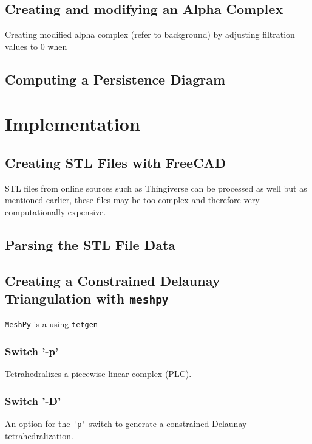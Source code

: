 \documentclass[ma]{uncgdissertationexp}
\theoremstyle{plain}
\theoremstyle{definition}
\theoremstyle{remark}
\begin{document}
\subsection{Creating and modifying an Alpha Complex}
\par Creating modified alpha complex (refer to background) by adjusting filtration values to 0 when 

\subsection{Computing a Persistence Diagram}

\section{Implementation}

\subsection{Creating STL Files with FreeCAD}

\par STL files from online sources such as Thingiverse can be processed as well but as mentioned earlier, these files may be too complex and therefore very computationally expensive. 

\subsection{Parsing the STL File Data}

\cprotect\subsection{Creating a Constrained Delaunay Triangulation with \verb+meshpy+}

\par \verb"MeshPy" is a using \verb"tetgen" \cite{tetgen}

\subsubsection{Switch '-p'}
Tetrahedralizes a piecewise linear complex (PLC).

\subsubsection{Switch '-D'}
An option for the \verb"'p'" switch to generate a constrained Delaunay tetrahedralization.
\end{document}
